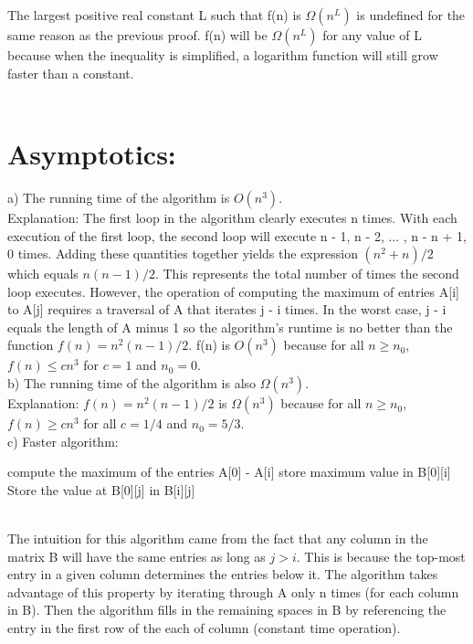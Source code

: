 \documentclass{article}
\begin{document}
The largest positive real constant L such that f(n) is $\Omega(n^L)$ is undefined for the same reason as the previous proof. f(n) will be $\Omega(n^L)$ for any value of L because when the inequality is simplified, a logarithm function will still grow faster than a constant.\\\\

\section{Asymptotics:}
a) The running time of the algorithm is $O(n^3)$.\\
Explanation: The first loop in the algorithm clearly executes n times. With each execution of the first loop, the second loop will execute n - 1, n - 2, ... , n - n + 1, 0 times. Adding these quantities together yields the expression $(n^2 + n)/2$ which equals $n(n-1)/2$. This represents the total number of times the second loop executes. However, the operation of computing the maximum of entries A[i] to A[j] requires a traversal of A that iterates j - i times. In the worst case, j - i equals the length of A minus 1 so the algorithm's runtime is no better than the function $f(n) = n^2(n-1)/2$. f(n) is $O(n^3)$ because for all $n \geq n_0$, $f(n) \leq cn^3$ for $c = 1$ and $n_0 = 0$.\\
b) The running time of the algorithm is also $\Omega(n^3)$.\\
Explanation: $f(n) = n^2(n-1)/2$ is $\Omega(n^3)$ because for all $n \geq n_0$, $f(n) \geq cn^3$ for all $c = 1/4$ and $n_0 = 5/3$.\\
c) Faster algorithm:\\
\begin{algorithmic}
    \STATE compute the maximum of the entries A[0] - A[i]
    \STATE store maximum value in B[0][i]
\ENDFOR
{}
        \STATE Store the value at B[0][j] in B[i][j]
    \ENDFOR
\ENDFOR
\end{algorithmic}\\
The intuition for this algorithm came from the fact that any column in the matrix B will have the same entries as long as $j > i$. This is because the top-most entry in a given column determines the entries below it. The algorithm takes advantage of this property by iterating through A only n times (for each column in B). Then the algorithm fills in the remaining spaces in B by referencing the entry in the first row of the each of column (constant time operation).\\
\end{document}

